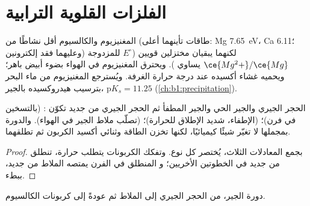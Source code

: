 \section{الفلزات القلوية الترابية}

المغنيزيوم والكالسيوم أقل نشاطًا من  (طاقات
تأينهما أعلى: Mg \qty{7.65}{eV}، Ca 6.11؛ وعليهما فقد إلكترونين) لكنهما
يبقيان مختزلين قويين ($E^\circ$ للمزدوجة $\ce{Mg^2+}/\ce{Mg}$ يساوي ).
ويحترق المغنيزيوم في الهواء بضوء أبيض باهر؛ ويحميه غشاء أكسيده
عند درجة حرارة الغرفة. ويُسترجع المغنيزيوم من ماء البحر
بترسيب هيدروكسيده بالجير، $\mathrm{p}K_s = 11.25$
(\cref{ch:b1:precipitation}).

\begin{proposition}\label{prop:b1:s-block:lime-cycle}
الحجر الجيري والجير الحي والجير المطفأ ثم الحجر الجيري من جديد تكوّن :
 (بالتسخين في فرن)؛ 
(الإطفاء، شديد الإطلاق للحرارة)؛  (تصلّب
ملاط الجير في الهواء). والدورة بمجملها لا تغيّر شيئًا كيميائيًا،
لكنها تخزن الطاقة وثنائي أكسيد الكربون ثم تطلقهما.
\end{proposition}

\begin{proof}
بجمع المعادلات الثلاث، يُختصر كل نوع. وتفكك
الكربونات يتطلب حرارة، تنطلق من جديد في الخطوتين الأخريين؛
و المنطلق في الفرن يمتصه الملاط من جديد، ببطء.
\end{proof}

\begin{omfigure}

{\small دورة الجير، من الحجر الجيري إلى الملاط ثم عودةً إلى كربونات
الكالسيوم.}
\end{omfigure}

